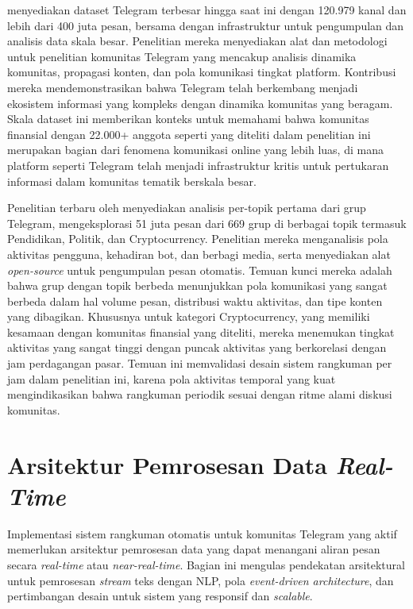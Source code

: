 \textcite{lamorgia2024} menyediakan dataset Telegram terbesar hingga saat ini dengan 120.979 kanal dan lebih dari 400 juta pesan, bersama dengan infrastruktur untuk pengumpulan dan analisis data skala besar. Penelitian mereka menyediakan alat dan metodologi untuk penelitian komunitas Telegram yang mencakup analisis dinamika komunitas, propagasi konten, dan pola komunikasi tingkat platform. Kontribusi mereka mendemonstrasikan bahwa Telegram telah berkembang menjadi ekosistem informasi yang kompleks dengan dinamika komunitas yang beragam. Skala dataset ini memberikan konteks untuk memahami bahwa komunitas finansial dengan 22.000+ anggota seperti yang diteliti dalam penelitian ini merupakan bagian dari fenomena komunikasi online yang lebih luas, di mana platform seperti Telegram telah menjadi infrastruktur kritis untuk pertukaran informasi dalam komunitas tematik berskala besar.

Penelitian terbaru oleh \textcite{perlo2025} menyediakan analisis per-topik pertama dari grup Telegram, mengeksplorasi 51 juta pesan dari 669 grup di berbagai topik termasuk Pendidikan, Politik, dan Cryptocurrency. Penelitian mereka menganalisis pola aktivitas pengguna, kehadiran bot, dan berbagi media, serta menyediakan alat \textit{open-source} untuk pengumpulan pesan otomatis. Temuan kunci mereka adalah bahwa grup dengan topik berbeda menunjukkan pola komunikasi yang sangat berbeda dalam hal volume pesan, distribusi waktu aktivitas, dan tipe konten yang dibagikan. Khususnya untuk kategori Cryptocurrency, yang memiliki kesamaan dengan komunitas finansial yang diteliti, mereka menemukan tingkat aktivitas yang sangat tinggi dengan puncak aktivitas yang berkorelasi dengan jam perdagangan pasar. Temuan ini memvalidasi desain sistem rangkuman per jam dalam penelitian ini, karena pola aktivitas temporal yang kuat mengindikasikan bahwa rangkuman periodik sesuai dengan ritme alami diskusi komunitas.

\section{Arsitektur Pemrosesan Data \textit{Real-Time}}
\label{sec:realtime-architecture}

Implementasi sistem rangkuman otomatis untuk komunitas Telegram yang aktif memerlukan arsitektur pemrosesan data yang dapat menangani aliran pesan secara \textit{real-time} atau \textit{near-real-time}. Bagian ini mengulas pendekatan arsitektural untuk pemrosesan \textit{stream} teks dengan NLP, pola \textit{event-driven architecture}, dan pertimbangan desain untuk sistem yang responsif dan \textit{scalable}.

